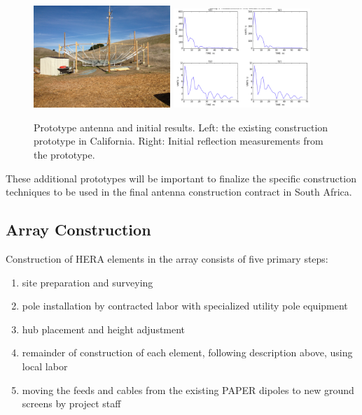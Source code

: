 \documentclass[preprint]{aastex}
\begin{document}
\begin{figure}[h]
	\centering
		\includegraphics[width=0.46\textwidth]{plots/heracles.png}
		\includegraphics[width=0.46\textwidth]{plots/Engineering/heraclesNA.png}
	\caption{\small
	Prototype antenna and initial results.
		Left: the existing construction prototype in California.
        Right: Initial reflection measurements from the prototype.}
	\label{fig:heracles}
\end{figure}

These additional prototypes will be important to finalize the specific construction techniques to be 
used in the final antenna construction contract in South Africa.

\vspace{-0.25in}
\subsection{Array Construction}
\vspace{-6pt}
Construction of HERA elements in the array consists of five primary steps: 
\begin{enumerate}
\item site preparation and surveying 
\item pole installation by contracted labor with specialized utility pole equipment 
\item hub placement and height adjustment
\item remainder of construction of each element, following description above, using local labor 
\item moving the feeds and cables from the existing PAPER dipoles to new ground screens by project staff
\end{enumerate}
\end{document}
